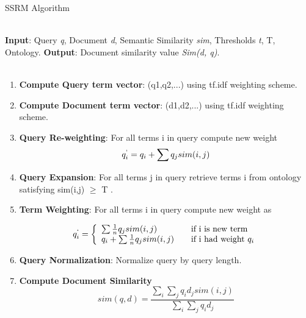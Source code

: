 
\begin{algorithm}
  \caption{SSRM Algorithm}
  \begin{algorithmic}
	\\  
	\State \textbf{Input}: Query \textit{q}, Document \textit{d}, Semantic 	Similarity \textit{sim}, Thresholds \textit{t}, T, Ontology.
	\State \textbf{Output}: Document similarity value \textit{Sim(d, q)}.\\\\

	\begin{enumerate}
	\item{\textbf{Compute Query term vector}: (q1,q2,...) using tf.idf weighting scheme.}
	\item{\textbf{Compute Document term vector}: (d1,d2,...) using tf.idf weighting scheme.}
	\item{\textbf{Query Re-weighting}: For all terms i in query compute new weight }
		\begin{equation}
		q_i^` = q_i + \sum q_j sim(i,j)
		\end{equation}
	\item{\textbf{Query Expansion}: For all terms j in query retrieve terms i from ontology satisfying sim(i,j) $\geq$ T .}
	\item{\textbf{Term Weighting}: For all terms i in query compute new weight as}
	
	\[q_i^` = \left\{ 
	\begin{array}{l l}
	  \sum \frac{1}{n} q_j sim(i,j) & \quad \mbox{if i is new term}\\
	  q_i + \sum \frac{1}{n} q_j sim(i,j) & \quad \mbox{if i had weight $q_i$}\\ \end{array} \right. \]
	  
	\item{\textbf{Query Normalization}: Normalize query by query length.}
	\item{\textbf{Compute Document Similarity}}
		\begin{equation}
		sim(q,d) = \frac{\sum_i \sum_j q_i d_j sim(i,j)}{\sum_i \sum_j q_i d_j}
		\end{equation}
	
	\end{enumerate}	
 \end{algorithmic}
\end{algorithm}
	


